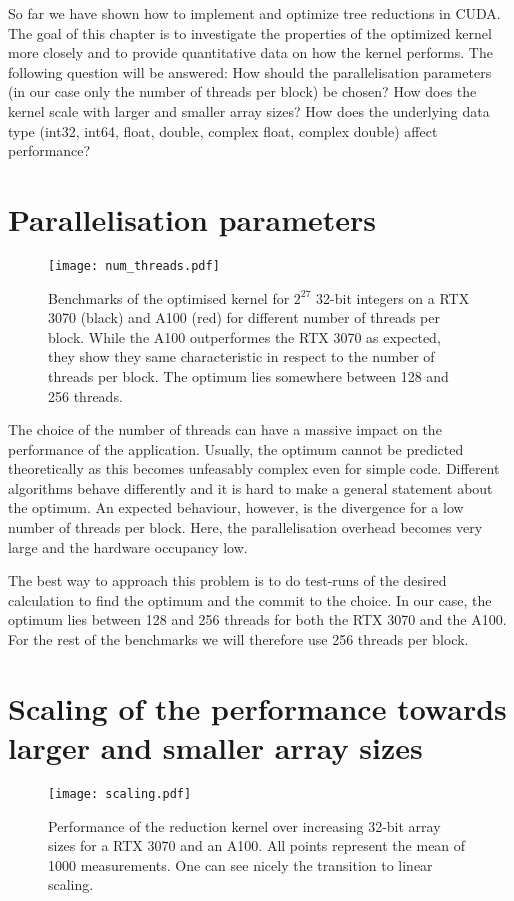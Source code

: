 So far we have shown how to implement and optimize tree reductions in CUDA.
The goal of this chapter is to investigate the properties of the optimized kernel more closely and to provide quantitative data on how the kernel performs. 
The following question will be answered:
How should the parallelisation parameters (in our case only the number of threads per block) be chosen?
How does the kernel scale with larger and smaller array sizes?
How does the underlying data type (int32, int64, float, double, complex float, complex double) affect performance?


\section{Parallelisation parameters}

\begin{figure} \label{fig_num_threads}
    \centering
    \texttt{[image: num\_threads.pdf]}
    \caption{
        Benchmarks of the optimised kernel for \( 2^{27} \) 32-bit integers on a RTX 3070 (black) and A100 (red) for different number of threads per block.
        While the A100 outperformes the RTX 3070 as expected, they show they same characteristic in respect to the number of threads per block.
        The optimum lies somewhere between 128 and 256 threads.
    }
\end{figure}

The choice of the number of threads can have a massive impact on the performance of the application.
Usually, the optimum cannot be predicted theoretically as this becomes unfeasably complex even for simple code.
Different algorithms behave differently and it is hard to make a general statement about the optimum.
An expected behaviour, however, is the divergence for a low number of threads per block.
Here, the parallelisation overhead becomes very large and the hardware occupancy low.

The best way to approach this problem is to do test-runs of the desired calculation to find the optimum and the commit to the choice.
In our case, the optimum lies between 128 and 256 threads for both the RTX 3070 and the A100.
For the rest of the benchmarks we will therefore use 256 threads per block.

\section{Scaling of the performance towards larger and smaller array sizes}

\begin{figure} \label{fig_scaling}
    \centering
    \texttt{[image: scaling.pdf]}
    \caption{
        Performance of the reduction kernel over increasing 32-bit array sizes for a RTX 3070 and an A100.
        All points represent the mean of 1000 measurements.
        One can see nicely the transition to linear scaling.
    }
\end{figure}

